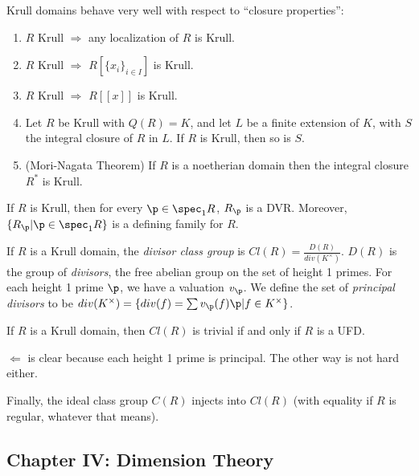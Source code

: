  Krull domains behave very well with respect to ``closure properties'':
 \begin{enumerate}
   \item $R$ Krull $\Longrightarrow$ any localization of $R$ is Krull.
   \item $R$ Krull $\Longrightarrow$ $R[\{x_i\}_{i\in I}]$ is Krull.
   \item $R$ Krull $\Longrightarrow$ $R[[x]]$ is Krull.
   \item Let $R$ be Krull with $Q(R)=K$, and let $L$ be a finite extension of $K$, with
   $S$ the integral closure of $R$ in $L$. If $R$ is Krull, then so is $S$.
   \item (Mori-Nagata Theorem) If $R$ is a noetherian domain then the integral closure
   $R^*$ is Krull.
 \end{enumerate}
 \begin{theorem}
   If $R$ is Krull, then for every $\p\in \spec_1 R$, $R_\p$ is a DVR. Moreover,
   $\{R_\p|\p\in \spec_1 R\}$ is a defining family for $R$.
 \end{theorem}
 \begin{definition}
   If $R$ is a Krull domain, the \emph{divisor class group} is $Cl(R) =
   \frac{D(R)}{div(K^\times)}$. $D(R)$ is the group of \emph{divisors}, the free abelian
   group on the set of height 1 primes. For each height 1 prime $\p$, we have a valuation
   $v_\p$. We define the set of \emph{principal divisors} to be $div(K^\times) = \{div(f)
   = \sum v_\p(f) \p| f\in K^\times\}$.
 \end{definition}
 \begin{theorem}
   If $R$ is a Krull domain, then $Cl(R)$ is trivial if and only if $R$ is a UFD.
 \end{theorem}
 $\Leftarrow$ is clear because each height 1 prime is principal. The other way is not
 hard either.

 Finally, the ideal class group $C(R)$ injects into $Cl(R)$ (with equality if $R$ is
 regular, whatever that means).

 \subsection{Chapter IV: Dimension Theory}

